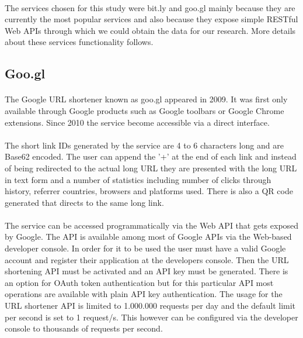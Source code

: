\documentclass[12pt]{article}
\begin{document}
\paragraph{} 
The services chosen for this study were bit.ly and goo.gl mainly because they are currently the most popular services and also because they expose simple RESTful Web APIs through which we could obtain the data for our research. More details about these services functionality follows. 

\subsection{Goo.gl}

\paragraph{}
The Google URL shortener known as goo.gl appeared in 2009. It was first only available through Google products such as Google toolbars or Google Chrome extensions. Since 2010 the service become accessible via a direct interface. 

\paragraph{}
The short link IDs generated by the service are 4 to 6 characters long and are Base62 encoded. The user can append the '+' at the end of each link and instead of being redirected to the actual long URL they are presented with the long URL in text form and a number of statistics including number of clicks through history, referrer countries, browsers and platforms used. There is also a QR code generated that directs to the same long link. 

\paragraph{}
The service can be accessed programmatically via the Web API that gets exposed by Google. The API is available among most of Google APIs via the Web-based developer console. In order for it to be used the user must have a valid Google account and register their application at the developers console. Then the URL shortening API must be activated and an API key must be generated. There is an option for OAuth token authentication but for this particular API most operations are available with plain API key authentication. The usage for the URL shortener API is limited to 1.000.000 requests per day and the default limit per second is set to 1 request/s. This however can be configured via the developer console to thousands of requests per second. 
\end{document}
